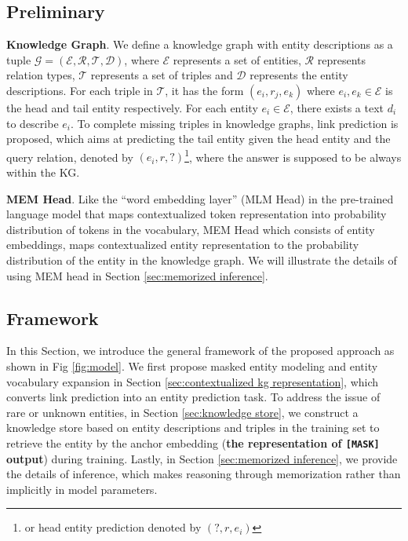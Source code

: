 \documentclass[runningheads]{llncs}
\begin{document}
\subsection{Preliminary}

\textbf{Knowledge Graph}.
We define a knowledge graph with entity descriptions as a tuple $\mathcal{G}=(\mathcal{E}, \mathcal{R}, \mathcal{T}, \mathcal{D})$, where $\mathcal{E}$ represents a set of entities, $\mathcal{R}$ represents relation types, $\mathcal{T}$ represents a set of triples and $ \mathcal{D}$ represents the entity descriptions. 
For each triple in $\mathcal{T}$, it has the form $(e_i, r_j, e_k)$ where $e_i, e_k \in \mathcal{E}$ is the head and tail entity respectively. For each entity $e_i \in \mathcal{E}$, there exists a text $d_i$ to describe $e_i$.
To complete missing triples in knowledge graphs, link prediction is proposed, which aims at predicting the tail entity given the head entity and the query relation, denoted by $(e_i, r, ?)$\footnote{or head entity prediction denoted by $(?, r, e_i)$},  where the answer is supposed to be always within the KG.



\textbf{MEM Head}.
Like the ``word embedding layer'' (MLM Head) in the pre-trained language model that maps contextualized token representation into probability distribution of tokens in the vocabulary, MEM Head which consists of entity embeddings, maps contextualized entity representation to the probability distribution of the entity in the knowledge graph.
We will illustrate the details of using MEM head in Section \ref{sec:memorized inference}.


\subsection{Framework}

In this Section, we introduce the general framework of the proposed approach as shown in Fig \ref{fig:model}. 
We first propose masked entity modeling and entity vocabulary expansion in Section \ref{sec:contextualized kg representation}, which converts link prediction into an entity prediction task.
To address the issue of rare or unknown entities,  in Section \ref{sec:knowledge store}, we construct a knowledge store based on entity descriptions and triples in the training set to retrieve the entity by the anchor embedding (\textbf{the representation of \texttt{[MASK]} output}) during training.
Lastly, in Section \ref{sec:memorized inference}, we provide the details of inference, which makes reasoning through memorization rather than implicitly in model parameters.
\end{document}
